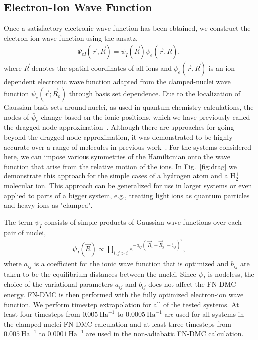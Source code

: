 \documentclass[pra,superscriptaddress,groupedaddress,twocolumn]{revtex4}
\begin{document}
\subsection{Electron-Ion Wave Function}

Once a satisfactory electronic wave function has been obtained, we construct the electron-ion wave function using the ansatz,
\begin{align}
\Psi_{eI}(\vec{r},\vec{R})=\psi_I(\vec{R})\bar{\psi}_e(\vec{r},\vec{R}), \label{eq:psi}
\end{align}
where $\vec{R}$ denotes the spatial coordinates of all ions and $\bar{\psi}_e(\vec{r},\vec{R})$ is an ion-dependent electronic wave function adapted from the clamped-nuclei wave function $\psi_e(\vec{r};\vec{R}_o)$ through basis set dependence. Due to the localization of Gaussian basis sets around nuclei, as used in quantum chemistry calculations, the nodes of $\bar{\psi}_e$ change based on the ionic positions, which we have previously called the dragged-node approximation~\cite{Tubman_ECG}. 
Although there are approaches for going beyond the dragged-node approximation, it was demonstrated to be highly accurate over a range of molecules in previous work~\cite{Tubman_ECG}. For the systems considered here, we can impose various symmetries of the Hamiltonian onto the wave function that arise from the relative motion of the ions. In Fig.~\ref{fig:drag} we demonstrate this approach for the simple cases of a hydrogen atom and a H$_2^+$ molecular ion. This approach can be generalized for use in larger systems or even applied to parts of a bigger system, e.g., treating light ions as quantum particles and heavy ions as "clamped".

The term $\psi_I$ consists of simple products of Gaussian wave functions over each pair of nuclei,
\begin{align}
\psi_I(\vec{R})\propto \prod\limits_{i,j>i}e^{-a_{ij}(\vert \vec{R}_i-\vec{R}_j\vert-b_{ij})^2},
\label{wfs_ions}
\end{align}
where $a_{ij}$ is a coefficient for the ionic wave function that is optimized and $b_{ij}$ are taken to be the equilibrium distances between the nuclei. Since $\psi_I$ is nodeless, the choice of the variational parameters $a_{ij}$ and $b_{ij}$ does not affect the FN-DMC energy. FN-DMC is then performed with the fully optimized electron-ion wave function. We perform timestep extrapolation for all of the tested systems. At least four timesteps from $0.005~\text{Ha}^{-1}$ to $0.0005~\text{Ha}^{-1}$ are used for all systems in the clamped-nuclei FN-DMC calculation and at least three timesteps from $0.005~\text{Ha}^{-1}$ to $0.0001~\text{Ha}^{-1}$ are used in the non-adiabatic FN-DMC calculation.
\end{document}
